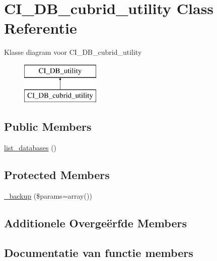 \hypertarget{class_c_i___d_b__cubrid__utility}{}\section{C\+I\+\_\+\+D\+B\+\_\+cubrid\+\_\+utility Class Referentie}
\label{class_c_i___d_b__cubrid__utility}
Klasse diagram voor C\+I\+\_\+\+D\+B\+\_\+cubrid\+\_\+utility\begin{figure}[H]
\begin{center}
\leavevmode
\includegraphics[height=2.000000cm]{class_c_i___d_b__cubrid__utility}
\end{center}
\end{figure}
\subsection*{Public Members}
\begin{DoxyCompactItemize}
\item 
\mbox{\hyperlink{class_c_i___d_b__cubrid__utility_a8486b247a8868504b055622cb2dd34d3}{list\+\_\+databases}} ()
\end{DoxyCompactItemize}
\subsection*{Protected Members}
\begin{DoxyCompactItemize}
\item 
\mbox{\hyperlink{class_c_i___d_b__cubrid__utility_a30f3053d2c82e7562349924363507afa}{\+\_\+backup}} (\$params=array())
\end{DoxyCompactItemize}
\subsection*{Additionele Overge\"{e}rfde Members}


\subsection{Documentatie van functie members}
\mbox{\label{class_c_i___d_b__cubrid__utility_a30f3053d2c82e7562349924363507afa}} 
